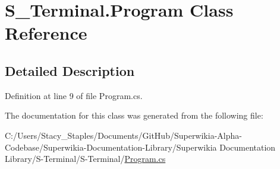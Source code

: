 \hypertarget{class_s___terminal_1_1_program}{\section{S\+\_\+\+Terminal.\+Program Class Reference}
\label{class_s___terminal_1_1_program}
}


\subsection{Detailed Description}


Definition at line 9 of file Program.\+cs.



The documentation for this class was generated from the following file\+:\begin{DoxyCompactItemize}
\item 
C\+:/\+Users/\+Stacy\+\_\+\+Staples/\+Documents/\+Git\+Hub/\+Superwikia-\/\+Alpha-\/\+Codebase/\+Superwikia-\/\+Documentation-\/\+Library/\+Superwikia Documentation Library/\+S-\/\+Terminal/\+S-\/\+Terminal/\hyperlink{_program_8cs}{Program.\+cs}\end{DoxyCompactItemize}
